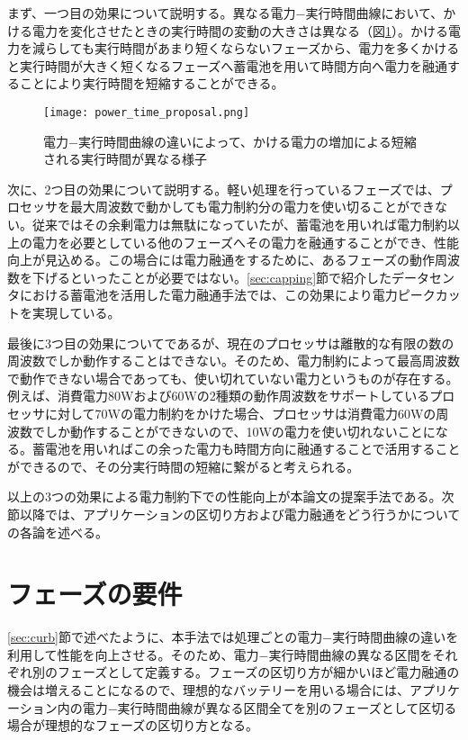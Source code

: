 まず、一つ目の効果について説明する。異なる電力−実行時間曲線において、かける電力を変化させたときの実行時間の変動の大きさは異なる（図\ref{fig:power_time_proposal}）。かける電力を減らしても実行時間があまり短くならないフェーズから、電力を多くかけると実行時間が大きく短くなるフェーズへ蓄電池を用いて時間方向へ電力を融通することにより実行時間を短縮することができる。

\begin{figure}[t]
 \begin{center}
  \texttt{[image: power\_time\_proposal.png]}
 \end{center}
 \caption{電力−実行時間曲線の違いによって、かける電力の増加による短縮される実行時間が異なる様子}
 \label{fig:power_time_proposal}
\end{figure}

次に、2つ目の効果について説明する。軽い処理を行っているフェーズでは、プロセッサを最大周波数で動かしても電力制約分の電力を使い切ることができない。従来ではその余剰電力は無駄になっていたが、蓄電池を用いれば電力制約以上の電力を必要としている他のフェーズへその電力を融通することができ、性能向上が見込める。この場合には電力融通をするために、あるフェーズの動作周波数を下げるといったことが必要ではない。\ref{sec:capping}節で紹介したデータセンタにおける蓄電池を活用した電力融通手法では、この効果により電力ピークカットを実現している。

最後に3つ目の効果についてであるが、現在のプロセッサは離散的な有限の数の周波数でしか動作することはできない。そのため、電力制約によって最高周波数で動作できない場合であっても、使い切れていない電力というものが存在する。例えば、消費電力80Wおよび60Wの2種類の動作周波数をサポートしているプロセッサに対して70Wの電力制約をかけた場合、プロセッサは消費電力60Wの周波数でしか動作することができないので、10Wの電力を使い切れないことになる。蓄電池を用いればこの余った電力も時間方向に融通することで活用することができるので、その分実行時間の短縮に繋がると考えられる。

以上の3つの効果による電力制約下での性能向上が本論文の提案手法である。次節以降では、アプリケーションの区切り方および電力融通をどう行うかについての各論を述べる。


\section{フェーズの要件}
\label{sec:phase1}

\ref{sec:curb}節で述べたように、本手法では処理ごとの電力−実行時間曲線の違いを利用して性能を向上させる。そのため、電力−実行時間曲線の異なる区間をそれぞれ別のフェーズとして定義する。フェーズの区切り方が細かいほど電力融通の機会は増えることになるので、理想的なバッテリーを用いる場合には、アプリケーション内の電力−実行時間曲線が異なる区間全てを別のフェーズとして区切る場合が理想的なフェーズの区切り方となる。

